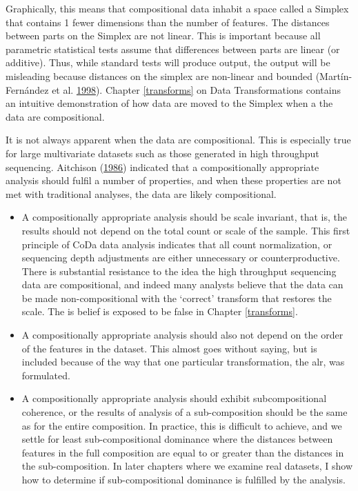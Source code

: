 \documentclass[onecolumn]{book}
\theoremstyle{definition}
\theoremstyle{definition}
\theoremstyle{definition}
\theoremstyle{remark}
\begin{document}
Graphically, this means that compositional data inhabit a space called a
Simplex that contains 1 fewer dimensions than the number of features.
The distances between parts on the Simplex are not linear. This is
important because all parametric statistical tests assume that
differences between parts are linear (or additive). Thus, while standard
tests will produce output, the output will be misleading because
distances on the simplex are non-linear and bounded (Martín-Fernández et
al. \protect\hyperlink{ref-martin1998measures}{1998}). Chapter
\ref{transforms} on Data Transformations contains an intuitive
demonstration of how data are moved to the Simplex when a the data are
compositional.

It is not always apparent when the data are compositional. This is
especially true for large multivariate datasets such as those generated
in high throughput sequencing. Aitchison
(\protect\hyperlink{ref-Aitchison:1986}{1986}) indicated that a
compositionally appropriate analysis should fulfil a number of
properties, and when these properties are not met with traditional
analyses, the data are likely compositional.

\begin{itemize}
\item
  A compositionally appropriate analysis should be scale invariant, that
  is, the results should not depend on the total count or scale of the
  sample. This first principle of CoDa data analysis indicates that all
  count normalization, or sequencing depth adjustments are either
  unnecessary or counterproductive. There is substantial resistance to
  the idea the high throughput sequencing data are compositional, and
  indeed many analysts believe that the data can be made
  non-compositional with the `correct' transform that restores the
  scale. The is belief is exposed to be false in Chapter
  \ref{transforms}.
\item
  A compositionally appropriate analysis should also not depend on the
  order of the features in the dataset. This almost goes without saying,
  but is included because of the way that one particular transformation,
  the alr, was formulated.
\item
  A compositionally appropriate analysis should exhibit subcompositional
  coherence, or the results of analysis of a sub-composition should be
  the same as for the entire composition. In practice, this is difficult
  to achieve, and we settle for least sub-compositional dominance where
  the distances between features in the full composition are equal to or
  greater than the distances in the sub-composition. In later chapters
  where we examine real datasets, I show how to determine if
  sub-compositional dominance is fulfilled by the analysis.
\end{itemize}
\end{document}
